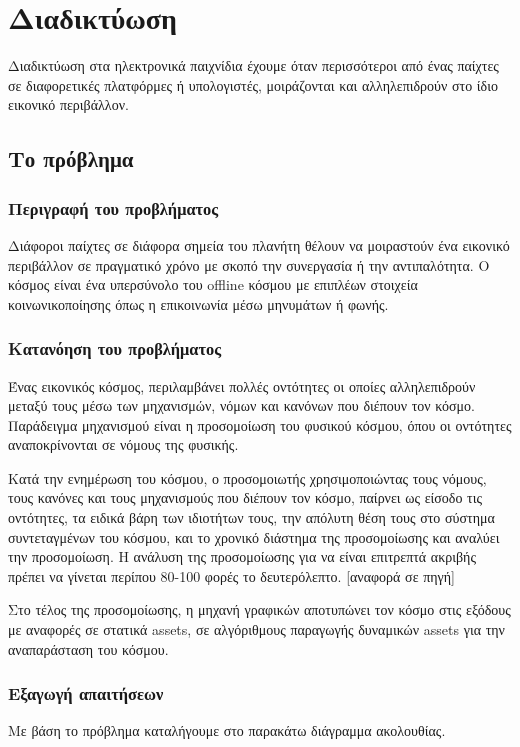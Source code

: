 	\chapter{Διαδικτύωση}
		Διαδικτύωση στα ηλεκτρονικά παιχνίδια έχουμε όταν περισσότεροι από ένας παίχτες σε διαφορετικές πλατφόρμες ή υπολογιστές, μοιράζονται και αλληλεπιδρούν στο ίδιο εικονικό περιβάλλον. 
		
		\section{Το πρόβλημα}
		\subsection{Περιγραφή του προβλήματος}
		Διάφοροι παίχτες σε διάφορα σημεία του πλανήτη θέλουν να μοιραστούν ένα εικονικό περιβάλλον σε πραγματικό χρόνο με σκοπό την συνεργασία ή την αντιπαλότητα. O κόσμος είναι ένα υπερσύνολο του offline κόσμου με επιπλέων στοιχεία κοινωνικοποίησης όπως η επικοινωνία μέσω μηνυμάτων ή φωνής.
		
		\subsection{Κατανόηση του προβλήματος}
		
		Ένας εικονικός κόσμος, περιλαμβάνει πολλές οντότητες οι  οποίες αλληλεπιδρούν μεταξύ τους μέσω των μηχανισμών, νόμων και κανόνων που διέπουν τον κόσμο. Παράδειγμα μηχανισμού είναι η προσομοίωση του φυσικού κόσμου, όπου οι οντότητες αναποκρίνονται σε νόμους της φυσικής.
		
	    Κατά την ενημέρωση του κόσμου, ο προσομοιωτής χρησιμοποιώντας  τους νόμους, τους κανόνες και τους μηχανισμούς που διέπουν τον κόσμο, παίρνει ως είσοδο τις οντότητες, τα ειδικά βάρη των ιδιοτήτων τους, την απόλυτη θέση τους στο σύστημα συντεταγμένων του κόσμου, και το χρονικό διάστημα της προσομοίωσης και αναλύει την προσομοίωση. Η ανάλυση της προσομοίωσης για να είναι επιτρεπτά ακριβής πρέπει να γίνεται περίπου 80-100 φορές το δευτερόλεπτο. [αναφορά σε πηγή]
		
		Στο τέλος της προσομοίωσης, η μηχανή γραφικών αποτυπώνει τον κόσμο στις εξόδους με αναφορές σε στατικά assets, σε αλγόριθμους παραγωγής δυναμικών assets για την αναπαράσταση του κόσμου.
	
		\subsection{Εξαγωγή απαιτήσεων}	
		Με βάση το πρόβλημα καταλήγουμε στο παρακάτω διάγραμμα ακολουθίας.
		
